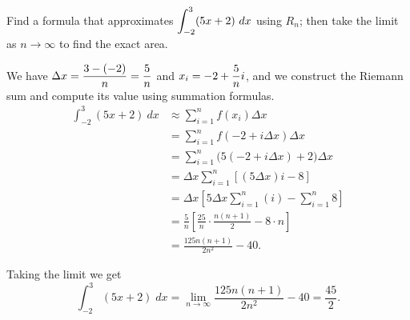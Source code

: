 \begin{example} %
Find a formula that approximates $\displaystyle \int_{-2}^3 (5x+2) \ dx$ using $R_n$; then take the limit as $n \to \infty$ to find the exact area.

\solution We have $\displaystyle \Delta x = \frac{3 - (-2)}{n} = \frac{5}{n}$ and $\displaystyle x_i = -2 + \frac{5}{n}i$,
and we construct the Riemann sum and compute its value using summation formulas.
\begin{align*}
\int_{-2}^3 (5x+2) \ dx & \approx \sum_{i=1}^{n} f(x_i) \Delta x \\
&=	\sum_{i=1}^{n} f(-2 + i \Delta x )\Delta x \\
&=	\sum_{i=1}^{n} \big( 5 (-2 + i \Delta x ) + 2 \big) \Delta x \\
&=	\Delta x \sum_{i=1}^{n} \left[ \left( 5 \Delta x \right) i - 8 \right] \\
&=	\Delta x \left[ 5 \Delta x \sum_{i=1}^{n} (i) - \sum_{i=1}^{n}8 \right] \\
&= \frac{5}{n} \left[ \frac{25}{n} \cdot \frac{n(n+1)}{2} - 8 \cdot n \right]  \\
&= \frac{125n(n+1)}{2n^2} - 40.
\end{align*}


Taking the limit we get 
\[ \int_{-2}^{3} (5x+2) \; dx = \lim_{n \to \infty} \frac{125n(n+1)}{2n^2} - 40 = \frac{45}{2}. \]
\end{example}